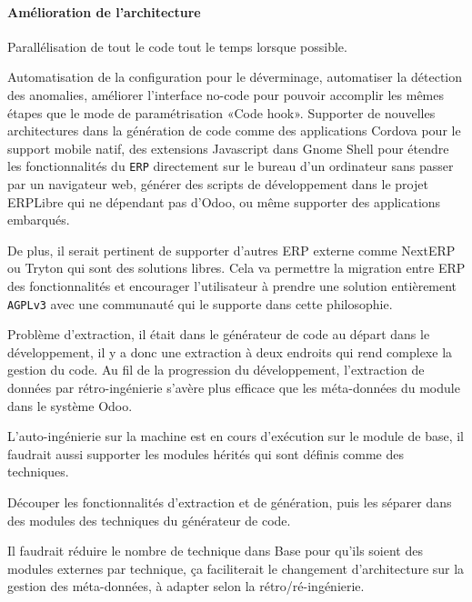 
\paragraph{Amélioration de l’architecture}
Parallélisation de tout le code tout le temps lorsque possible.

Automatisation de la configuration pour le déverminage, automatiser la détection des anomalies, améliorer l’interface no-code pour pouvoir accomplir les mêmes étapes que le mode de paramétrisation «Code hook». Supporter de nouvelles architectures dans la génération de code comme des applications Cordova pour le support mobile natif, des extensions Javascript dans Gnome Shell pour étendre les fonctionnalités du \texttt{ERP} directement sur le bureau d’un ordinateur sans passer par un navigateur web, générer des scripts de développement dans le projet ERPLibre qui ne dépendant pas d’Odoo, ou même supporter des applications embarqués.

De plus, il serait pertinent de supporter d’autres ERP externe comme NextERP ou Tryton qui sont des solutions libres. Cela va permettre la migration entre ERP des fonctionnalités et encourager l’utilisateur à prendre une solution entièrement \texttt{AGPLv3} avec une communauté qui le supporte dans cette philosophie.

Problème d’extraction, il était dans le générateur de code au départ dans le développement, il y a donc une extraction à deux endroits qui rend complexe la gestion du code. Au fil de la progression du développement, l’extraction de données par rétro-ingénierie s’avère plus efficace que les méta-données du module dans le système Odoo.

L’auto-ingénierie sur la machine est en cours d’exécution sur le module de base, il faudrait aussi supporter les modules hérités qui sont définis comme des techniques.

Découper les fonctionnalités d'extraction et de génération, puis les séparer dans des modules des techniques du générateur de code.

Il faudrait réduire le nombre de technique dans Base pour qu’ils soient des modules externes par technique, ça faciliterait le changement d’architecture sur la gestion des méta-données, à adapter selon la rétro/ré-ingénierie.


